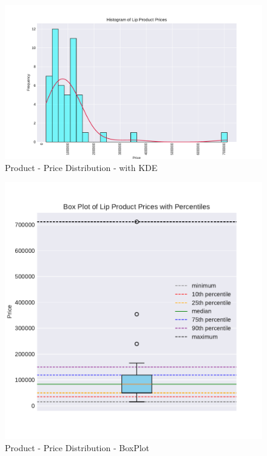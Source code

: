 \documentclass{article}
\begin{document}
\begin{center}
    \begin{figure}[htbp]
        \centering
        \includegraphics[scale=0.6]{../images/KDE_Prices.pdf}
        \caption{Product - Price Distribution - with KDE}
        \label{KDE_Prices}
    \end{figure}

    \begin{figure}[htbp]
        \centering
        \includegraphics[scale=0.6]{../images/Box_Prices.pdf}
        \caption{Product - Price Distribution - BoxPlot}
        \label{Box_Prices}
    \end{figure}


\end{center}
\end{document}

